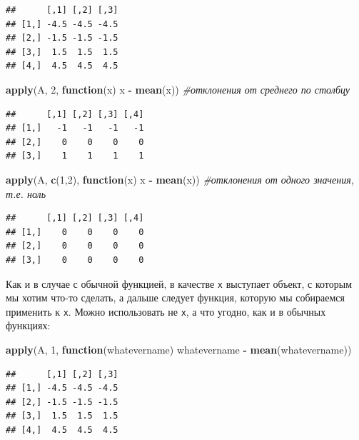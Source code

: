 \documentclass[]{book}
\newenvironment{Shaded}{\begin{snugshade}}{\end{snugshade}}
\newcommand{\KeywordTok}[1]{\textcolor[rgb]{0.13,0.29,0.53}{\textbf{#1}}}
\newcommand{\DecValTok}[1]{\textcolor[rgb]{0.00,0.00,0.81}{#1}}
\newcommand{\StringTok}[1]{\textcolor[rgb]{0.31,0.60,0.02}{#1}}
\newcommand{\CommentTok}[1]{\textcolor[rgb]{0.56,0.35,0.01}{\textit{#1}}}
\newcommand{\ControlFlowTok}[1]{\textcolor[rgb]{0.13,0.29,0.53}{\textbf{#1}}}
\newcommand{\OperatorTok}[1]{\textcolor[rgb]{0.81,0.36,0.00}{\textbf{#1}}}
\newcommand{\NormalTok}[1]{#1}
\begin{document}
\begin{verbatim}
##      [,1] [,2] [,3]
## [1,] -4.5 -4.5 -4.5
## [2,] -1.5 -1.5 -1.5
## [3,]  1.5  1.5  1.5
## [4,]  4.5  4.5  4.5
\end{verbatim}

\begin{Shaded}
\begin{Highlighting}[]
\KeywordTok{apply}\NormalTok{(A, }\DecValTok{2}\NormalTok{, }\ControlFlowTok{function}\NormalTok{(x) x }\OperatorTok{-}\StringTok{ }\KeywordTok{mean}\NormalTok{(x)) }\CommentTok{#отклонения от среднего по столбцу}
\end{Highlighting}
\end{Shaded}

\begin{verbatim}
##      [,1] [,2] [,3] [,4]
## [1,]   -1   -1   -1   -1
## [2,]    0    0    0    0
## [3,]    1    1    1    1
\end{verbatim}

\begin{Shaded}
\begin{Highlighting}[]
\KeywordTok{apply}\NormalTok{(A, }\KeywordTok{c}\NormalTok{(}\DecValTok{1}\NormalTok{,}\DecValTok{2}\NormalTok{), }\ControlFlowTok{function}\NormalTok{(x) x }\OperatorTok{-}\StringTok{ }\KeywordTok{mean}\NormalTok{(x)) }\CommentTok{#отклонения от одного значения, т.е. ноль}
\end{Highlighting}
\end{Shaded}

\begin{verbatim}
##      [,1] [,2] [,3] [,4]
## [1,]    0    0    0    0
## [2,]    0    0    0    0
## [3,]    0    0    0    0
\end{verbatim}

Как и в случае с обычной функцией, в качестве \texttt{x} выступает
объект, с которым мы хотим что-то сделать, а дальше следует функция,
которую мы собираемся применить к \texttt{х}. Можно использовать не
\texttt{х}, а что угодно, как и в обычных функциях:

\begin{Shaded}
\begin{Highlighting}[]
\KeywordTok{apply}\NormalTok{(A, }\DecValTok{1}\NormalTok{, }\ControlFlowTok{function}\NormalTok{(whatevername) whatevername }\OperatorTok{-}\StringTok{ }\KeywordTok{mean}\NormalTok{(whatevername))}
\end{Highlighting}
\end{Shaded}

\begin{verbatim}
##      [,1] [,2] [,3]
## [1,] -4.5 -4.5 -4.5
## [2,] -1.5 -1.5 -1.5
## [3,]  1.5  1.5  1.5
## [4,]  4.5  4.5  4.5
\end{verbatim}
\end{document}

